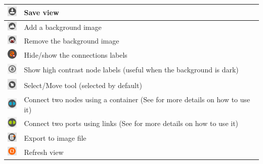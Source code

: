 \documentclass[a4paper]{article}
\begin{document}
		\begin{table}[h!]
			\centering
			\begin{tabular}[h!]{lp{10cm}}
				\includegraphics[width=0.5cm]{img/icon_save.png} & Save view\\
				\midrule
				\includegraphics[width=0.5cm]{img/icon_add_background.png} & Add a background image\\
				\midrule
				\includegraphics[width=0.5cm]{img/icon_remove_background.png} & Remove the background image\\
				\midrule
				\includegraphics[width=0.5cm]{img/icon_toggle_conn_labels.png} & Hide/show the connections labels\\
				\midrule
				\includegraphics[width=0.5cm]{img/object_view_high_contrast.png} & Show high contrast node labels (useful when the background is dark)\\
				\midrule
				\includegraphics[width=0.5cm]{img/icon_select_tool.png} & Select/Move tool (selected by default)\\
				\midrule
				\includegraphics[width=0.5cm]{img/object_view_container.png} & Connect two nodes using a container (See \textbf{\nameref{sec:physical_connections}} for more details on how to use it)\\
				\midrule
				\includegraphics[width=0.5cm]{img/object_view_link.png} & Connect two ports using links (See \textbf{\nameref{sec:physical_connections}} for more details on how to use it)\\	
				\midrule
				\includegraphics[width=0.5cm]{img/icon_export.png} & Export to image file\\
				\midrule
				\includegraphics[width=0.5cm]{img/icon_refresh_view.png} & Refresh view\\			
			\end{tabular}
		\end{table}
		
\end{document}
